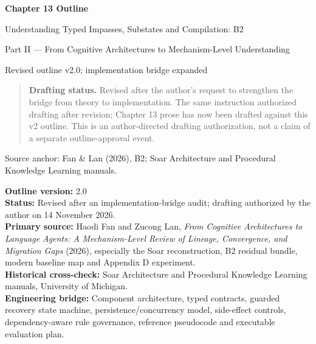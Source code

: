 


\thispagestyle{empty}
\begin{center}
\vspace*{2.2cm}
{\Huge\bfseries Chapter 13 Outline}\par
\vspace{0.7cm}
{\LARGE Understanding Typed Impasses, Substates and Compilation: B2}\par
\vspace{0.8cm}
{\Large Part II --- From Cognitive Architectures to Mechanism-Level Understanding}\par
\vspace{1.2cm}
{\large Revised outline v2.0; implementation bridge expanded}\par
\vfill
\begin{minipage}{0.82\linewidth}
\begin{quote}
\textbf{Drafting status.} Revised after the author's request to strengthen the bridge from theory to implementation. The same instruction authorized drafting after revision; Chapter 13 prose has now been drafted against this v2 outline. This is an author-directed drafting authorization, not a claim of a separate outline-approval event.
\end{quote}
\end{minipage}
\vfill
{\large Source anchor: Fan \& Lan (2026), B2; Soar Architecture and Procedural Knowledge Learning manuals.}\par
{}
\vspace{1cm}
\end{center}
\clearpage
\tableofcontents
\clearpage
{}
\textbf{Outline version:} 2.0\\
\textbf{Status:} Revised after an implementation-bridge audit; drafting authorized by the author on 14 November 2026.\\
\textbf{Primary source:} Haodi Fan and Zucong Lan, \emph{From Cognitive Architectures to Language Agents: A Mechanism-Level Review of Lineage, Convergence, and Migration Gaps} (2026), especially the Soar reconstruction, B2 residual bundle, modern baseline map and Appendix D experiment.\\
\textbf{Historical cross-check:} Soar Architecture and Procedural Knowledge Learning manuals, University of Michigan.\\
\textbf{Engineering bridge:} Component architecture, typed contracts, guarded recovery state machine, persistence/concurrency model, side-effect controls, dependency-aware rule governance, reference pseudocode and executable evaluation plan.\\

\backmatter
\nocite{fanlan2026mechanisms,soar2025architecture,soar2025procedural}
\printbibliography[heading=bibintoc,title={References}]

